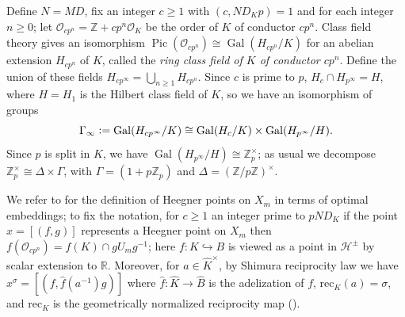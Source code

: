 \documentclass[a4paper,11pt]{amsart}
\numberwithin{equation}{section}
\theoremstyle{plain}
\theoremstyle{definition}
\theoremstyle{remark}
\newcommand{\Z}{\mathbb{Z}}
\newcommand{\R}{\mathbb{R}}
\newcommand{\defeq}{\vcentcolon=}
\DeclareMathOperator{\Pic}{Pic}
\DeclareMathOperator{\Gal}{Gal}
\begin{document}
{Define $N=MD$, fix an integer $c\geq 1$ with $(c,ND_Kp)=1$ 
and for each integer $n\geq 0$; let 
$\mathcal{O}_{cp^n}=\Z+cp^n\mathcal{O}_K$ be the order of $K$ of conductor $cp^n$. Class field theory gives an isomorphism 
$\Pic(\mathcal{O}_{cp^n})\cong \Gal(H_{cp^n}/K)$ for an abelian extension $H_{cp^n}$ of $K$, called the \emph{ring class field of $K$ of conductor $cp^n$}. 
Define the union of these fields 
$H_{cp^\infty}=\bigcup_{n\geq 1} H_{cp^n}.$
Since $c$ is prime to $p$, $H_{c}\cap H_{p^\infty}=H$, where $H=H_1$ is the Hilbert class field of $K$, 
so we have an isomorphism of groups 
\[\Gamma_\infty\defeq \Gal(H_{cp^\infty}/K)\cong  \Gal(H_c/K)\times\Gal(H_{p^\infty}/H).\]
Since $p$ is split in $K$, we have  $\Gal(H_{p^\infty}/H)\cong \Z_p^\times$; as usual we decompose $\Z_p^\times\cong \Delta\times\Gamma$, with $\Gamma=(1+p\Z_p)$ and $\Delta=(\Z/p\Z)^\times$.

We refer to \cite[Definition 3.1]{LV-MM} for the definition of Heegner points on $X_m$
in terms of optimal embeddings; to fix the notation, for $c\geq 1$ an integer prime to $pND_K$ 
if the point  
$x=[(f,g)]$ represents a Heegner point on $X_m$ 
then $f(\mathcal{O}_{cp^n})=f(K)\cap gU_mg^{-1}$; here $f\colon K\hookrightarrow B$ is viewed as a point in $\mathcal{H}^\pm$ by scalar extension to $\R$. Moreover, for $a\in\widehat{K}^\times$, 
by Shimura reciprocity law we have 
$x^\sigma=[(f,\hat{f}(a^{-1})g)]$
where $\hat{f}\colon\widehat{K}\rightarrow\widehat{B}$ is the adelization of $f$,
$\mathrm{rec}_K(a)=\sigma$, and $\mathrm{rec}_K$ is the geometrically normalized reciprocity map 
(\cite[Theorem 9.6]{shimura}). 

}
\end{document}
